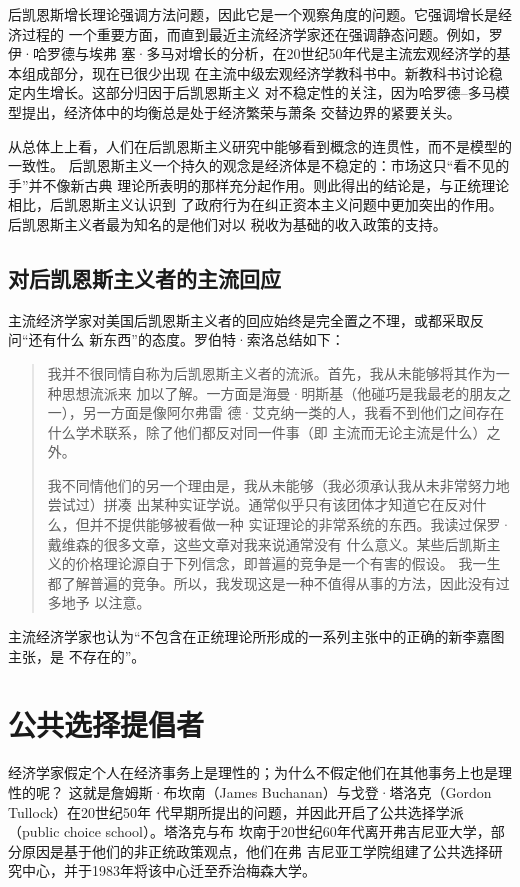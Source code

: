 后凯恩斯增长理论强调方法问题，因此它是一个观察角度的问题。它强调增长是经济过程的
一个重要方面，而直到最近主流经济学家还在强调静态问题。例如，罗伊·哈罗德与埃弗
塞·多马对增长的分析，在20世纪50年代是主流宏观经济学的基本组成部分，现在已很少出现
在主流中级宏观经济学教科书中。新教科书讨论稳定内生增长。这部分归因于后凯恩斯主义
对不稳定性的关注，因为哈罗德--多马模型提出，经济体中的均衡总是处于经济繁荣与萧条
交替边界的紧要关头。

从总体上上看，人们在后凯恩斯主义研究中能够看到概念的连贯性，而不是模型的一致性。
后凯恩斯主义一个持久的观念是经济体是不稳定的：市场这只“看不见的手”并不像新古典
理论所表明的那样充分起作用。则此得出的结论是，与正统理论相比，后凯恩斯主义认识到
了政府行为在纠正资本主义问题中更加突出的作用。后凯恩斯主义者最为知名的是他们对以
税收为基础的收入政策的支持。

\subsection{对后凯恩斯主义者的主流回应}

主流经济学家对美国后凯恩斯主义者的回应始终是完全置之不理，或都采取反问“还有什么
新东西”的态度。罗伯特·索洛总结如下：

\begin{quotation}
  我并不很同情自称为后凯恩斯主义者的流派。首先，我从未能够将其作为一种思想流派来
  加以了解。一方面是海曼·明斯基（他碰巧是我最老的朋友之一），另一方面是像阿尔弗雷
  德·艾克纳一类的人，我看不到他们之间存在什么学术联系，除了他们都反对同一件事（即
  主流而无论主流是什么）之外。

  我不同情他们的另一个理由是，我从未能够（我必须承认我从未非常努力地尝试过）拼凑
  出某种实证学说。通常似乎只有该团体才知道它在反对什么，但并不提供能够被看做一种
  实证理论的非常系统的东西。我读过保罗·戴维森的很多文章，这些文章对我来说通常没有
  什么意义。某些后凯斯主义的价格理论源自于下列信念，即普遍的竞争是一个有害的假设。
  我一生都了解普遍的竞争。所以，我发现这是一种不值得从事的方法，因此没有过多地予
  以注意。
\end{quotation}

主流经济学家也认为“不包含在正统理论所形成的一系列主张中的正确的新李嘉图主张，是
不存在的”。

\section{公共选择提倡者}

经济学家假定个人在经济事务上是理性的；为什么不假定他们在其他事务上也是理性的呢？
这就是詹姆斯·布坎南（James Buchanan）与戈登·塔洛克（Gordon Tullock）在20世纪50年
代早期所提出的问题，并因此开启了公共选择学派（public choice school）。塔洛克与布
坎南于20世纪60年代离开弗吉尼亚大学，部分原因是基于他们的非正统政策观点，他们在弗
吉尼亚工学院组建了公共选择研究中心，并于1983年将该中心迁至乔治梅森大学。

